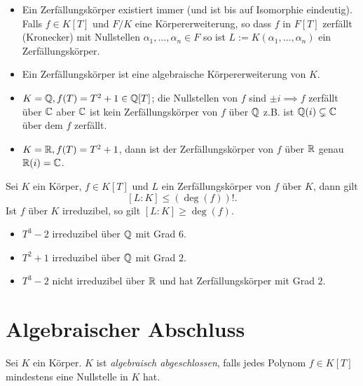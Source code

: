 \begin{remark}
	\begin{itemize}
		\item Ein Zerfällungskörper existiert immer (und ist bis auf Isomorphie eindeutig).
			Falls $f \in K[T]$ und $F / K$ eine Körpererweiterung, so dass $f$ in $F[T]$ zerfällt (Kronecker)
			mit Nullstellen $\alpha_1,\ldots,\alpha_{n} \in F$ so ist $L := K(\alpha_1,\ldots,\alpha_{n})$ ein Zerfällungskörper.
		\item Ein Zerfällungskörper ist eine algebraische Körpererweiterung von $K$.
	\end{itemize}
\end{remark}

\begin{eg}
	\begin{itemize}
		\item $K = \mathbb{Q}, f(T) = T^2 +1 \in \mathbb{Q}[T]$; die Nullstellen von $f$ sind $\pm i \implies f$
			zerfällt über $\mathbb{C}$ aber $\mathbb{C}$ ist kein Zerfällungskörper von $f$ über $\mathbb{Q}$
			z.B. ist $\mathbb{Q}(i) \subsetneq \mathbb{C}$ über dem $f$ zerfällt.
		\item $K = \mathbb{R}, f(T)= T^2+1$, dann ist der Zerfällungskörper von $f$ über $\mathbb{R}$ genau $\mathbb{R}(i) = \mathbb{C}$.
	\end{itemize}
\end{eg}

\begin{remark}
	Sei $K$ ein Körper, $f \in K[T]$ und $L$ ein Zerfällungskörper von $f$ über $K$, dann gilt
	\[
		[L:K] \leq (\deg(f))!
	.\]
	Ist $f$ über $K$ irreduzibel, so gilt $[L:K] \geq \deg(f)$.
	\begin{itemize}
		\item $T^3-2$ irreduzibel über $\mathbb{Q}$ mit Grad $6$.
		\item $T^2+1$ irreduzibel über $\mathbb{Q}$ mit Grad $2$.
		\item $T^3-2$ nicht irreduzibel über $\mathbb{R}$ und hat Zerfällungskörper mit Grad $2$.
	\end{itemize}
\end{remark}

\section{Algebraischer Abschluss}
\begin{definition}
	Sei $K$ ein Körper. $K$ ist \emph{algebraisch abgeschlossen}, falls jedes Polynom $f \in K[T]$ 
	mindestens eine Nullstelle in $K$ hat.
\end{definition}

